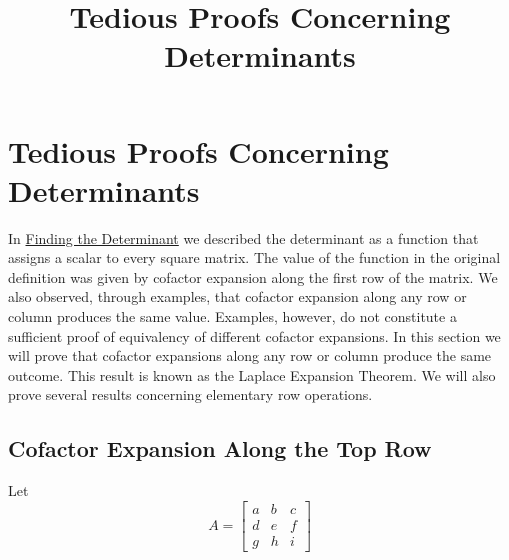 \documentclass{ximera}
\title{Tedious Proofs Concerning Determinants} \license{CC BY-NC-SA 4.0}
\begin{document}
\begin{abstract}

\end{abstract}
\maketitle


\section*{Tedious Proofs Concerning Determinants}
In \href{https://ximera.osu.edu/oerlinalg/LinearAlgebra/DET-0010/main}{Finding the Determinant} we described the determinant as a function that assigns a scalar to every square matrix.  The value of the function in the original definition was given by cofactor expansion along the first row of the matrix.  We also observed, through examples, that cofactor expansion along any row or column produces the same value.  Examples, however, do not constitute a sufficient proof of equivalency of different cofactor expansions.  In this section we will prove that cofactor expansions along any row or column produce the same outcome.  This result is known as the Laplace Expansion Theorem.  We will also prove several results concerning elementary row operations.

\subsection*{Cofactor Expansion Along the Top Row}
Let 
$$A=\begin{bmatrix}a&b&c\\d&e&f\\g&h&i\end{bmatrix}$$
\end{document}

